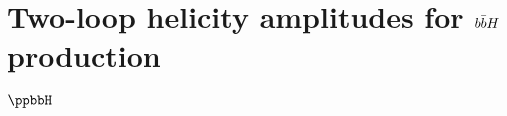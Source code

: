 \documentclass[main.tex]{subfiles}
\begin{document}
\chapter{Two-loop helicity amplitudes for $b\bar{b}H$ production} \label{sec:Hbb}
$\ppbbH$
\end{document}
